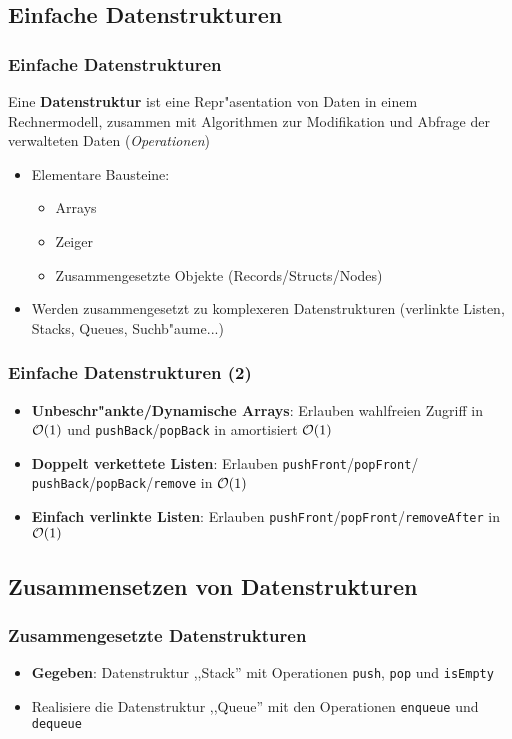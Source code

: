 \subsection{Einfache Datenstrukturen}
\begin{frame}
  \frametitle{Einfache Datenstrukturen}
  \begin{definition}
    Eine \textbf{Datenstruktur} ist eine Repr"asentation von Daten in einem
    Rechnermodell, zusammen mit Algorithmen zur Modifikation und Abfrage der
    verwalteten Daten (\emph{Operationen})
  \end{definition}
  \begin{itemize}
  \item Elementare Bausteine:
    \begin{itemize}
      \item Arrays
      \item Zeiger
      \item Zusammengesetzte Objekte (Records/Structs/Nodes)
    \end{itemize}
  \item Werden zusammengesetzt zu komplexeren Datenstrukturen (verlinkte Listen,
        Stacks, Queues, Suchb"aume...)
  \end{itemize}
\end{frame}

\begin{frame}
  \frametitle{Einfache Datenstrukturen (2)}
  \begin{itemize}
    \item \textbf{Unbeschr"ankte/Dynamische Arrays}: Erlauben wahlfreien Zugriff in $\mathcal{O}(1)$
          und \lstinline{pushBack}/\lstinline{popBack} in amortisiert $\mathcal{O}(1)$
    \item \textbf{Doppelt verkettete Listen}: Erlauben
          \lstinline|pushFront|/\lstinline|popFront|/
          \lstinline|pushBack|/\lstinline|popBack|/\lstinline|remove| in $\mathcal{O}(1)$
    \item \textbf{Einfach verlinkte Listen}: Erlauben
          \lstinline|pushFront|/\lstinline|popFront|/\lstinline|removeAfter|
          in $\mathcal{O}(1)$
  \end{itemize}
\end{frame}

\subsection{Zusammensetzen von Datenstrukturen}
\begin{frame}
  \frametitle{Zusammengesetzte Datenstrukturen}
  \begin{itemize}
  \item \textbf{Gegeben}: Datenstruktur ,,Stack'' mit Operationen \lstinline|push|,
        \lstinline|pop| und \lstinline|isEmpty|
  \item Realisiere die Datenstruktur ,,Queue'' mit den Operationen \lstinline|enqueue|
        und \lstinline|dequeue|
  \end{itemize}
\end{frame}

